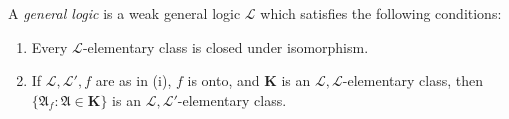 A \emph{general logic} is a weak general logic $\mathscr{L}$ which satisfies the following conditions:

\begin{enumerate}
\item[(1)] Every $\mathscr{L}$-elementary class is closed under isomorphism.
\item[(2)] If $\mathcal{L}, \mathcal{L}', f$ are as in (i), $f$ is onto, and $\mathbf{K}$ is an $\mathscr{L}, \mathcal{L}$-elementary class, then $\{ \mathfrak{A}_f : \mathfrak{A} \in \mathbf{K} \}$ is an $\mathscr{L}, \mathcal{L}'$-elementary class.
\end{enumerate}
